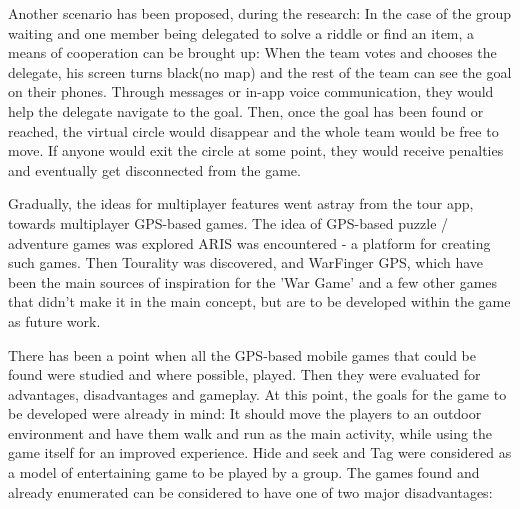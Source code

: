 Another scenario has been proposed, during the research: In the case of the
group waiting and one member being delegated to solve a riddle or find an item,
a means of cooperation can be brought up: When the team votes and chooses the
delegate, his screen turns black(no map) and the rest of the team can see
the goal on their phones. Through messages or in-app voice communication,
they would help the delegate navigate to the goal. Then, once the goal has been
found or reached, the virtual circle would disappear and the whole team would be
free to move. If anyone would exit the circle at some point, they would receive
penalties and eventually get disconnected from the game.\newline

Gradually, the ideas for multiplayer features went astray from the tour app,
towards multiplayer GPS-based games. The idea of GPS-based puzzle / adventure
games was explored ARIS was encountered - a platform for creating such games.
Then Tourality was discovered, and WarFinger GPS, which have been the main
sources of inspiration for the 'War Game' and a few other games that didn't make
it in the main concept, but are to be developed within the game as future
work.\newline

There has been a point when all the GPS-based mobile games that could be
found were studied and where possible, played. Then they were evaluated for
advantages, disadvantages and gameplay. At this point, the goals for the game to
be developed were already in mind: It should move the players to an outdoor
environment and have them walk and run as the main activity, while using the
game itself for an improved experience. Hide and seek and Tag were considered as
a model of entertaining game to be played by a group. The games found and
already enumerated can be considered to have one of two major disadvantages:

